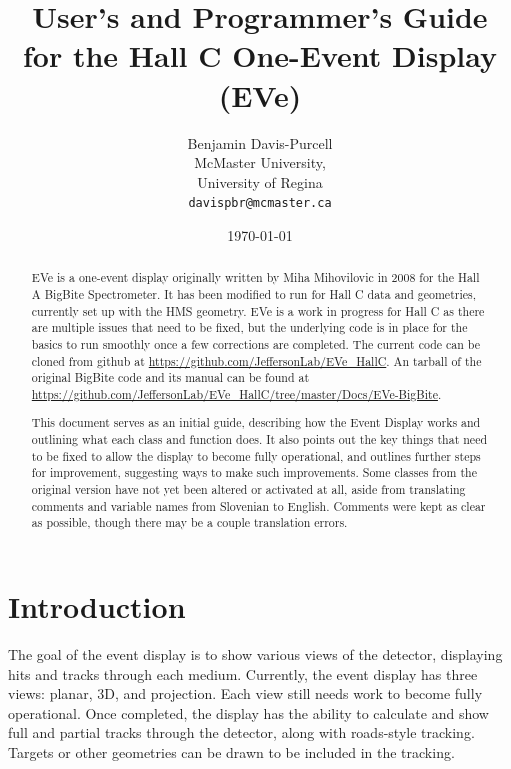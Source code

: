 \documentclass[12pt]{article}
\numberwithin{equation}{section}
\begin{document}
\title{User's and Programmer's Guide for the Hall C One-Event Display (EVe)}
\author{Benjamin Davis-Purcell\\
McMaster University,\\
University of Regina\\
\texttt{davispbr@mcmaster.ca}}
\date{\today}
\maketitle
\begin{abstract}
EVe is a one-event display originally written by Miha Mihovilovic in 2008 for the Hall A BigBite Spectrometer. It has been modified to run for Hall C data and geometries, currently set up with the HMS geometry. EVe is a work in progress for Hall C as there are multiple issues that need to be fixed, but the underlying code is in place for the basics to run smoothly once a few corrections are completed. The current code can be cloned from github at \url{https://github.com/JeffersonLab/EVe\_HallC}. An tarball of the original BigBite code and its manual can be found at \url{https://github.com/JeffersonLab/EVe\_HallC/tree/master/Docs/EVe-BigBite}.

This document serves as an initial guide, describing how the Event Display works and outlining what each class and function does. It also points out the key things that need to be fixed to allow the display to become fully operational, and outlines further steps for improvement, suggesting ways to make such improvements. Some classes from the original version have not yet been altered or activated at all, aside from translating comments and variable names from Slovenian to English. Comments were kept as clear as possible, though there may be a couple translation errors.
\end{abstract}

\pagebreak
\tableofcontents
\pagebreak

\section{Introduction}
The goal of the event display is to show various views of the detector, displaying hits and tracks through each medium. Currently, the event display has three views: planar, 3D, and projection. Each view still needs work to become fully operational. Once completed, the display has the ability to calculate and show full and partial tracks through the detector, along with roads-style tracking. Targets or other geometries can be drawn to be included in the tracking.
\end{document}
